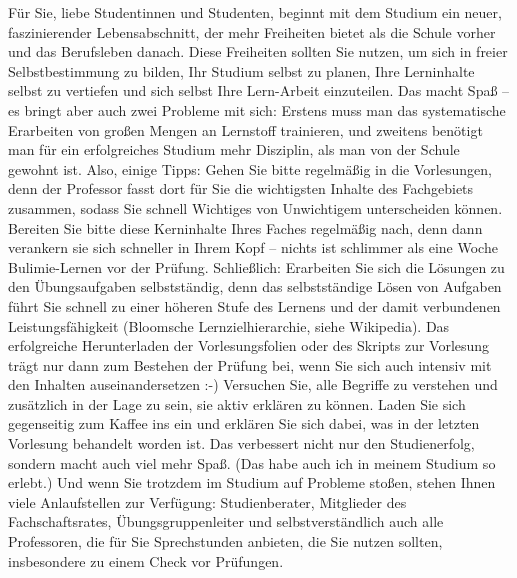 {Für Sie, liebe Studentinnen und Studenten, beginnt mit dem Studium ein neuer, faszinierender Lebensabschnitt, der mehr Freiheiten bietet als die Schule vorher und das Berufsleben danach. Diese Freiheiten sollten Sie nutzen, um sich in freier Selbstbestimmung zu bilden, Ihr Studium selbst zu planen, Ihre Lerninhalte selbst zu vertiefen und sich selbst Ihre Lern-Arbeit einzuteilen. Das macht Spaß -- es bringt aber auch zwei Probleme mit sich: Erstens muss man das systematische Erarbeiten von großen Mengen an Lernstoff trainieren, und zweitens benötigt man für ein erfolgreiches Studium mehr Disziplin, als man von der Schule gewohnt ist. Also, einige Tipps: Gehen Sie bitte regelmäßig in die Vorlesungen, denn der Professor fasst dort für Sie die wichtigsten Inhalte des Fachgebiets zusammen, sodass Sie schnell Wichtiges von Unwichtigem unterscheiden können. Bereiten Sie bitte diese Kerninhalte Ihres Faches regelmäßig nach, denn dann verankern sie sich schneller in Ihrem Kopf -- nichts ist schlimmer als eine Woche Bulimie-Lernen vor der Prüfung. Schließlich: Erarbeiten Sie sich die Lösungen zu den Übungsaufgaben selbstständig, denn das selbstständige Lösen von Aufgaben führt Sie schnell zu einer höheren Stufe des Lernens und der damit verbundenen Leistungsfähigkeit (Bloomsche Lernzielhierarchie, siehe Wikipedia). Das erfolgreiche Herunterladen der Vorlesungsfolien oder des Skripts zur Vorlesung trägt nur dann zum Bestehen der Prüfung bei, wenn Sie sich auch intensiv mit den Inhalten auseinandersetzen :-) Versuchen Sie, alle Begriffe zu verstehen und zusätzlich in der Lage zu sein, sie aktiv erklären zu können. Laden Sie sich gegenseitig zum Kaffee ins \ascii{} ein und erklären Sie sich dabei, was in der letzten Vorlesung behandelt worden ist.  Das verbessert nicht nur den Studienerfolg, sondern macht auch viel mehr Spaß. (Das habe auch ich in meinem Studium so erlebt.) Und wenn Sie trotzdem im Studium auf Probleme stoßen, stehen Ihnen viele Anlaufstellen zur Verfügung: Studienberater, Mitglieder des Fachschaftsrates, Übungsgruppenleiter und selbstverständlich auch alle Professoren, die für Sie Sprechstunden anbieten, die Sie nutzen sollten, insbesondere zu einem Check vor Prüfungen.


}

